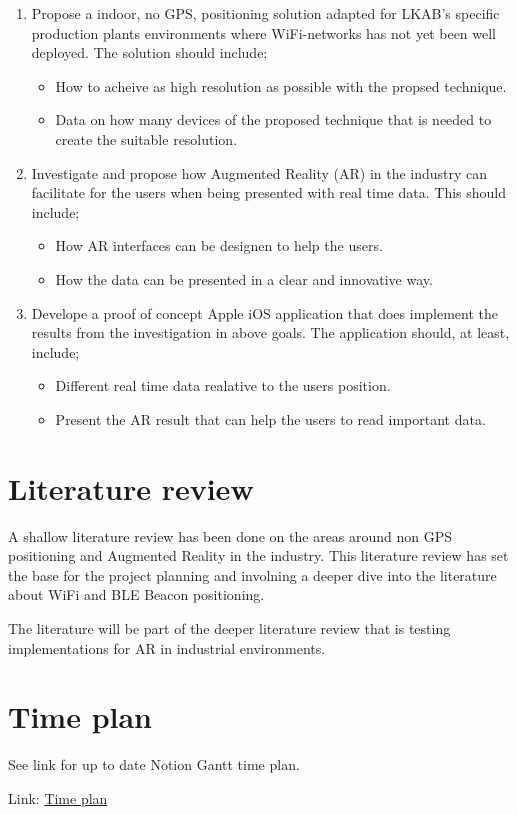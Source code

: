 \documentclass[12pt]{article}
\begin{document}
\begin{enumerate}
  \item Propose a indoor, no GPS, positioning solution adapted for LKAB's specific production plants environments where WiFi-networks has not yet been well deployed. The solution should include;
  \begin{itemize}
    \item How to acheive as high resolution as possible with the propsed technique.
    \item Data on how many devices of the proposed technique that is needed to create the suitable resolution.
  \end{itemize}
\item Investigate and propose how Augmented Reality (AR) in the industry can facilitate for the users when being presented with real time data. This should include;
    \begin{itemize}
      \item How AR interfaces can be designen to help the users.
      \item How the data can be presented in a clear and innovative way.
    \end{itemize}
  \item Develope a proof of concept Apple iOS application that does implement the results from the investigation in above goals. The application should, at least, include;
  \begin{itemize}
    \item Different real time data realative to the users position.
    \item Present the AR result that can help the users to read important data.
  \end{itemize}
\end{enumerate}

\section{Literature review}
A shallow literature review has been done on the areas around non GPS positioning and Augmented Reality in the industry.
This literature review has set the base for the project planning and involning a deeper dive into the literature \cite{AutonomousSmartphoneBasedWiFi2015, AutomaticConstructionRadio2018, WiFiFingerprintIndoor2012, PracticalFingerprintingLocalization2017} about WiFi and BLE Beacon positioning.

\bigskip

The literature \cite{AdoptingAugmentedReality2020, SystematicDesignMethod2020} will be part of the deeper literature review that is testing implementations for AR in industrial environments.


\section{Time plan}
See link for up to date Notion Gantt time plan.

Link: \href{https://www.notion.so/8a79758540934203ab65633360c26e38?v=030857f20c6349c09f2894d37717f17f}{Time plan}

\newpage
\printbibliography
\end{document}
